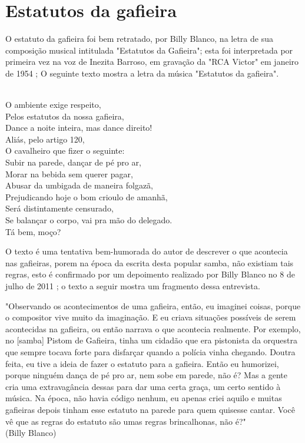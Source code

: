 \section{Estatutos da gafieira}
O estatuto da gafieira foi bem retratado, por Billy Blanco,
na letra de sua composição musical intitulada "Estatutos da Gafieira"; 
esta foi interpretada por primeira vez na voz de Inezita Barroso, 
em gravação da "RCA Victor" em janeiro de 1954 \cite{musicaestatuto};
O seguinte texto mostra a letra da música "Estatutos da gafieira".
\begin{tcolorbox}[colback=lowgray,colframe=lowgray]%
\\
O ambiente exige respeito,\\
Pelos estatutos da nossa gafieira,\\
Dance a noite inteira, mas dance direito!\\
Aliás, pelo artigo 120,\\
O cavalheiro que fizer o seguinte:\\
Subir na parede, dançar de pé pro ar,\\
Morar na bebida sem querer pagar,\\
Abusar da umbigada de maneira folgazã,\\
Prejudicando hoje o bom crioulo de amanhã,\\
Será distintamente censurado,\\
Se balançar o corpo, vai pra mão do delegado.\\
Tá bem, moço?\\
\end{tcolorbox}
O texto é uma tentativa bem-humorada do autor de descrever o que acontecia 
nas gafieiras, porem na época da escrita desta popular samba, não
existiam tais regras, esto é confirmado por um depoimento realizado por 
Billy Blanco no 8 de julho de 2011 \cite{depoimentobilly}; o texto a seguir
mostra um fragmento dessa entrevista.

\begin{tcolorbox}[colback=lowgray,colframe=lowgray]%
"Observando os acontecimentos de uma gafieira, então, eu imaginei
coisas, porque o compositor vive muito da imaginação. E eu criava situações 
possíveis de serem acontecidas na gafieira, ou então narrava o que
acontecia realmente. Por exemplo, no [samba] Pistom de Gafieira, tinha
um cidadão que era pistonista da orquestra que sempre tocava forte para
disfarçar quando a polícia vinha chegando. Doutra feita, eu tive a ideia
de fazer o estatuto para a gafieira. Então eu humorizei, porque ninguém
dança de pé pro ar, nem sobe em parede, não é? Mas a gente cria uma
extravagância dessas para dar uma certa graça, um certo sentido à música.
Na época, não havia código nenhum, eu apenas criei aquilo e muitas gafieiras 
depois tinham esse estatuto na parede para quem quisesse cantar.
Você vê que as regras do estatuto são umas regras brincalhonas, não é?" 
~\\
(Billy Blanco)
\end{tcolorbox}

